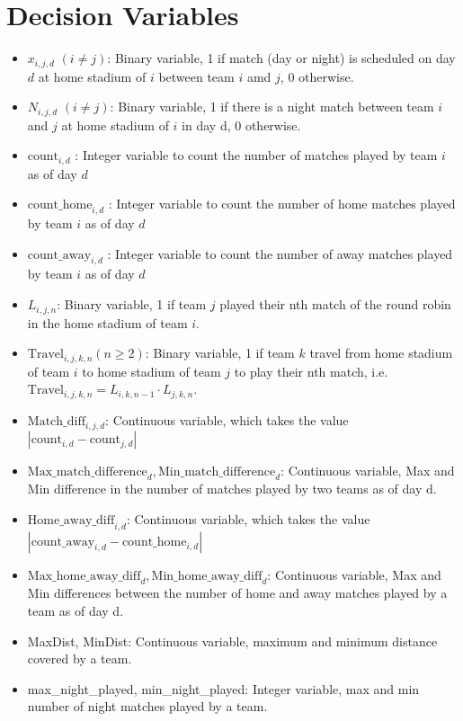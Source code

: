 \documentclass[a4paper, 12pt]{article}
\begin{document}
\section*{Decision Variables}
\begin{itemize}
    \item $x_{i,j,d}$ $(i \neq j)$: Binary variable, 1 if match (day or night) is scheduled on day $d$ at home stadium of $i$ between team $i$ amd $j$, 0 otherwise.
    \item $N_{i,j,d}$ $(i \neq j)$: Binary variable, 1 if there is a night match between team $i$ and $j$ at home stadium of $i$ in day d, 0 otherwise.
    \item $\text{count}_{i,d}$ : Integer variable to count the number of matches played by team $i$ as of day $d$
    \item $\text{count\_home}_{i,d}$ : Integer variable to count the number of home matches played by team $i$ as of day $d$
    \item $\text{count\_away}_{i,d}$ : Integer variable to count the number of away matches played by team $i$ as of day $d$
    \item $L_{i,j,n}$: Binary variable, 1 if team $j$ played their nth match of the round robin in the home stadium of team $i$.
    \item $\text{Travel}_{i,j,k,n} (n \geq 2)$: Binary variable, 1 if team $k$ travel from home stadium of team $i$ to home stadium of team $j$ to play their nth match, i.e. $\text{Travel}_{i,j,k,n} = L_{i,k,n-1}\cdot L_{j,k,n}$.
    \item $\text{Match\_diff}_{i,j,d}$: Continuous variable, which takes the value $|\text{count}_{i,d} - \text{count}_{j,d}|$ 
    \item $\text{Max\_match\_difference}_{d},\text{Min\_match\_difference}_{d}$: Continuous variable, Max and Min difference in the number of matches played by two teams as of day d.
    \item $\text{Home\_away\_diff}_{i,d}$: Continuous variable, which takes the value $|\text{count\_away}_{i,d} - \text{count\_home}_{i,d}|$ 
    \item $\text{Max\_home\_away\_diff}_{d},\text{Min\_home\_away\_diff}_{d}$: Continuous variable, Max and Min differences between the number of home and away matches played by a team as of day d. 
    \item MaxDist, MinDist: Continuous variable, maximum and minimum distance covered by a team.
    \item max\_night\_played, min\_night\_played: Integer variable, max and min number of night matches played by a team.

\end{itemize}
\end{document}
